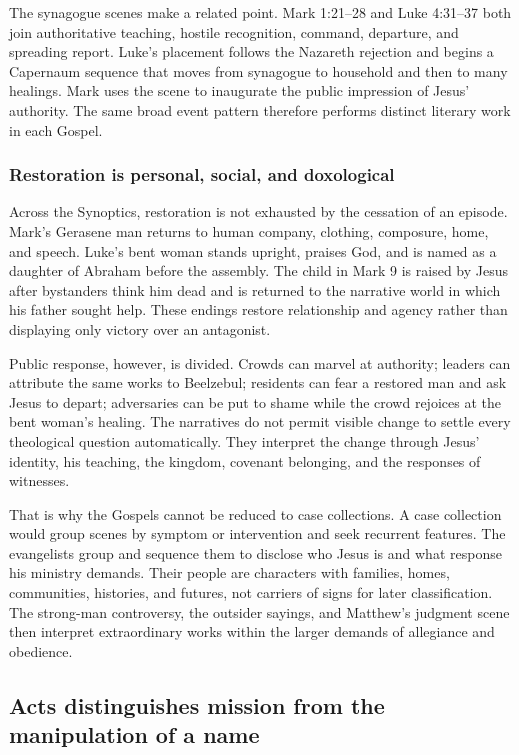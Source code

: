 The synagogue scenes make a related point. Mark 1:21--28 and Luke 4:31--37
both join authoritative teaching, hostile recognition, command, departure,
and spreading report. Luke's placement follows the Nazareth rejection and
begins a Capernaum sequence that moves from synagogue to household and then
to many healings. Mark uses the scene to inaugurate the public impression of
Jesus' authority. The same broad event pattern therefore performs distinct
literary work in each Gospel.

\subsubsection{Restoration is personal, social, and doxological}

Across the Synoptics, restoration is not exhausted by the cessation of an
episode. Mark's Gerasene man returns to human company, clothing, composure,
home, and speech. Luke's bent woman stands upright, praises God, and is named
as a daughter of Abraham before the assembly. The child in Mark 9 is raised
by Jesus after bystanders think him dead and is returned to the narrative
world in which his father sought help. These endings restore relationship and
agency rather than displaying only victory over an antagonist.

Public response, however, is divided. Crowds can marvel at authority; leaders
can attribute the same works to Beelzebul; residents can fear a restored man
and ask Jesus to depart; adversaries can be put to shame while the crowd
rejoices at the bent woman's healing. The narratives do not permit visible
change to settle every theological question automatically. They interpret
the change through Jesus' identity, his teaching, the kingdom, covenant
belonging, and the responses of witnesses.

That is why the Gospels cannot be reduced to case collections. A case
collection would group scenes by symptom or intervention and seek recurrent
features. The evangelists group and sequence them to disclose who Jesus is
and what response his ministry demands. Their people are characters with
families, homes, communities, histories, and futures, not carriers of signs
for later classification. The strong-man controversy, the outsider sayings,
and Matthew's judgment scene then interpret extraordinary works within the
larger demands of allegiance and obedience.

\subsection{Acts distinguishes mission from the manipulation of a name}

